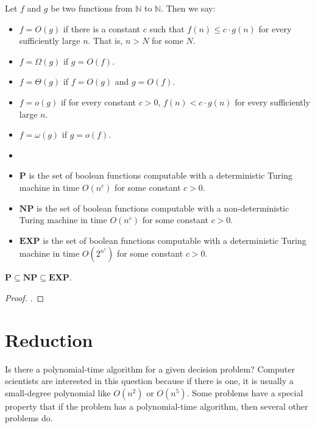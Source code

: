     \begin{defn} \label{def_bigo}
        Let $f$ and $g$ be two functions from $\mathbb{N}$ to $\mathbb{N}$. Then we say: \begin{itemize}
            \item $f=O(g)$ if there is a constant $c$ such that $f(n) \leq c \cdot g(n)$ for every sufficiently large $n$. That is, $n>N$ for some $N$.
            \item $f=\Omega(g)$ if $g=O(f)$.
            \item $f=\Theta(g)$ if $f=O(g)$ and $g=O(f)$.
            \item $f=o(g)$ if for every constant $c>0$, $f(n) < c \cdot g(n)$ for every sufficiently large $n$.
            \item $f=\omega(g)$ if $g=o(f)$.
        \end{itemize} 
    \end{defn}
        
    \begin{defn}[P, NP, EXP] \label{def_comp_p}
        \begin{itemize}
            \item []
            \item $\mathbf{P}$ is the set of boolean functions computable with a deterministic Turing machine in time $O(n^c)$ for some constant $c>0$.
            \item $\mathbf{NP}$ is the set of boolean functions computable with a non-deterministic Turing machine in time $O(n^c)$ for some constant $c>0$.
            \item $\mathbf{EXP}$ is the set of boolean functions computable with a deterministic Turing machine in time $O(2^{n^c})$ for some constant $c>0$.
        \end{itemize}
    \end{defn}
        
    \begin{thm} \label{thm_pnpexp}
        $\mathbf{P} \subseteq \mathbf{NP} \subseteq \mathbf{EXP}$.
    \end{thm}
        
    \begin{proof}
        .
    \end{proof}
    
    \section {Reduction}
    Is there a polynomial-time algorithm for a given decision problem? Computer scientists are interested in this question because if there is one, it is usually a small-degree polynomial like $O(n^2)$ or $O(n^5)$. Some problems have a special property that if the problem has a polynomial-time algorithm, then several other problems do.
        
